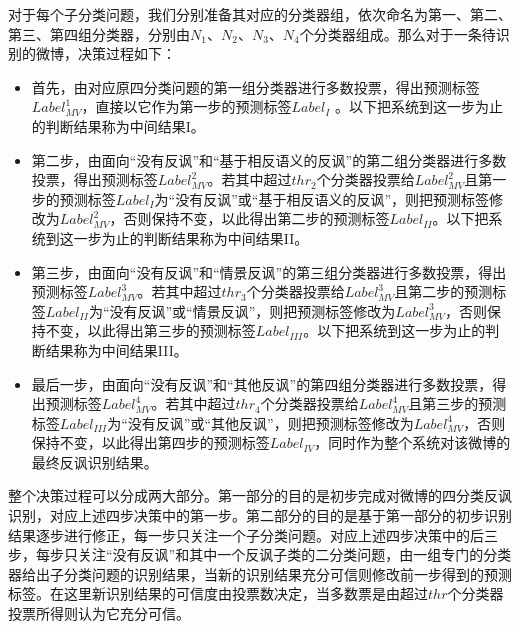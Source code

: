 对于每个子分类问题，我们分别准备其对应的分类器组，依次命名为第一、第二、第三、第四组分类器，分别由$N_1$、$N_2$、$N_3$、$N_4$个分类器组成。那么对于一条待识别的微博，决策过程如下：

\begin{itemize}

\item 首先，由对应原四分类问题的第一组分类器进行多数投票，得出预测标签$Label^{1}_{MV}$，直接以它作为第一步的预测标签$Label_{I}$ 。以下把系统到这一步为止的判断结果称为中间结果I。

\item 第二步，由面向“没有反讽”和“基于相反语义的反讽”的第二组分类器进行多数投票，得出预测标签$Label^{2}_{MV}$。若其中超过$thr_{2}$个分类器投票给$Label^{2}_{MV}$且第一步的预测标签$Label_{I}$为“没有反讽”或“基于相反语义的反讽”，则把预测标签修改为$Label^{2}_{MV}$，否则保持不变，以此得出第二步的预测标签$Label_{II}$。以下把系统到这一步为止的判断结果称为中间结果II。

\item 第三步，由面向“没有反讽”和“情景反讽”的第三组分类器进行多数投票，得出预测标签$Label^{3}_{MV}$。若其中超过$thr_{3}$个分类器投票给$Label^{3}_{MV}$且第二步的预测标签$Label_{II}$为“没有反讽”或“情景反讽”，则把预测标签修改为$Label^{3}_{MV}$，否则保持不变，以此得出第三步的预测标签$Label_{III}$。以下把系统到这一步为止的判断结果称为中间结果III。

\item 最后一步，由面向“没有反讽”和“其他反讽”的第四组分类器进行多数投票，得出预测标签$Label^{4}_{MV}$。若其中超过$thr_{4}$个分类器投票给$Label^{4}_{MV}$且第三步的预测标签$Label_{III}$为“没有反讽”或“其他反讽”，则把预测标签修改为$Label^{4}_{MV}$，否则保持不变，以此得出第四步的预测标签$Label_{IV}$，同时作为整个系统对该微博的最终反讽识别结果。

\end{itemize}

整个决策过程可以分成两大部分。第一部分的目的是初步完成对微博的四分类反讽识别，对应上述四步决策中的第一步。第二部分的目的是基于第一部分的初步识别结果逐步进行修正，每一步只关注一个子分类问题。对应上述四步决策中的后三步，每步只关注“没有反讽”和其中一个反讽子类的二分类问题，由一组专门的分类器给出子分类问题的识别结果，当新的识别结果充分可信则修改前一步得到的预测标签。在这里新识别结果的可信度由投票数决定，当多数票是由超过$thr$个分类器投票所得则认为它充分可信。


